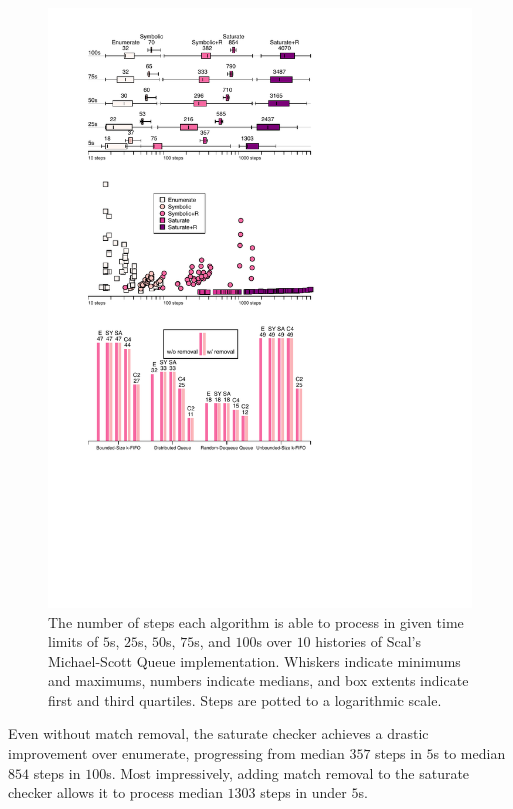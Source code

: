 \begin{figure}[t]

  \centering
  \includegraphics[width=\linewidth]{figures/steps-until-timeout}

  \caption{The number of steps each algorithm is able to process in given time
  limits of $5$s, $25$s, $50$s, $75$s, and $100$s over $10$ histories of Scal’s
  Michael-Scott Queue implementation. Whiskers indicate minimums and maximums,
  numbers indicate medians, and box extents indicate first and third quartiles.
  Steps are potted to a logarithmic scale.}

  \label{fig:steps}

\end{figure}

Even without match removal, the {\sc saturate} checker achieves a drastic
improvement over {\sc enumerate}, progressing from median $357$ steps in $5$s
to median $854$ steps in $100$s. Most impressively, adding match removal to the
{\sc saturate} checker allows it to process median $1303$ steps in under $5$s.

